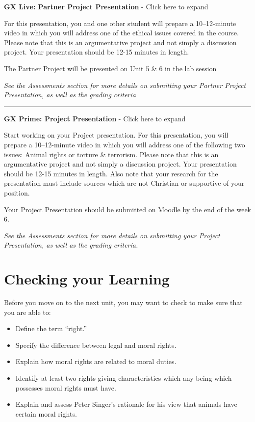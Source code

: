 \documentclass[
]{book}
\providecommand{\tightlist}{%
  \setlength{\itemsep}{0pt}\setlength{\parskip}{0pt}}
\begin{document}
\begin{assessment}
\textbf{GX Live: Partner Project Presentation} - Click here to expand

For this presentation, you and one other student will prepare a 10--12-minute video in which you will address one of the ethical issues covered in the course. Please note that this is an argumentative project and not simply a discussion project. Your presentation should be 12-15 minutes in length.

The Partner Project will be presented on Unit 5 \& 6 in the lab session

\emph{See the Assessments section for more details on submitting your Partner Project Presentation, as well as the grading criteria}

\begin{center}\rule{0.5\linewidth}{0.5pt}\end{center}

\textbf{GX Prime: Project Presentation} - Click here to expand

Start working on your Project presentation. For this presentation, you will prepare a 10--12-minute video in which you will address one of the following two issues: Animal rights or torture \& terrorism. Please note that this is an argumentative project and not simply a discussion project. Your presentation should be 12-15 minutes in length. Also note that your research for the presentation must include sources which are not Christian or supportive of your position.

Your Project Presentation should be submitted on Moodle by the end of the week 6.

\emph{See the Assessments section for more details on submitting your Project Presentation, as well as the grading criteria.}
\end{assessment}

\hypertarget{checking-your-learning-4}{%
\section*{Checking your Learning}\label{checking-your-learning-4}}

\begin{progress}
Before you move on to the next unit, you may want to check to make sure that you are able to:

\begin{itemize}
\tightlist
\item
  Define the term ``right.''
\item
  Specify the difference between legal and moral rights.
\item
  Explain how moral rights are related to moral duties.
\item
  Identify at least two rights-giving-characteristics which any being which possesses moral rights must have.
\item
  Explain and assess Peter Singer's rationale for his view that animals have certain moral rights.
\end{itemize}
\end{progress}
\end{document}
